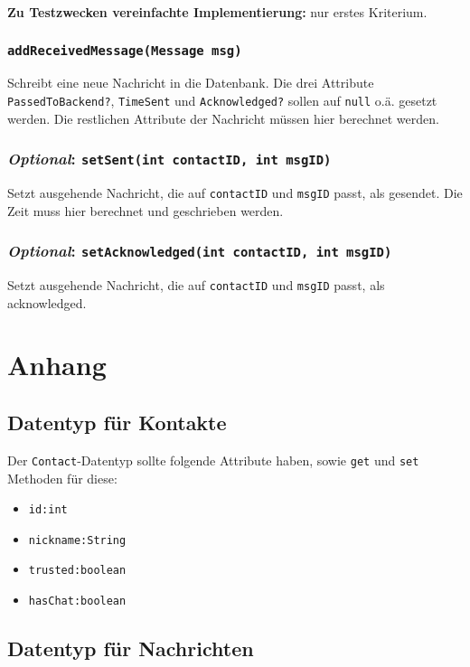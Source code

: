 \documentclass[a4paper]{article}
\begin{document}
    \textbf{Zu Testzwecken vereinfachte Implementierung:}
    nur erstes Kriterium.

    \subsubsection{\texttt{addReceivedMessage(Message msg)}}
    Schreibt eine neue Nachricht in die Datenbank.
    Die drei Attribute \texttt{PassedToBackend?}, \texttt{TimeSent} und \texttt{Acknowledged?} sollen auf \texttt{null} o.ä. gesetzt werden.
    Die restlichen Attribute der Nachricht müssen hier berechnet werden.

    \subsubsection{\textit{Optional}: \texttt{setSent(int contactID, int msgID)}}
    Setzt ausgehende Nachricht, die auf \texttt{contactID} und \texttt{msgID} passt, als gesendet.
    Die Zeit muss hier berechnet und geschrieben werden.

    \subsubsection{\textit{Optional}: \texttt{setAcknowledged(int contactID, int msgID)}}
    Setzt ausgehende Nachricht, die auf \texttt{contactID} und \texttt{msgID} passt, als acknowledged.

    \section{Anhang}

    \subsection{Datentyp für Kontakte}

    Der \texttt{Contact}-Datentyp sollte folgende Attribute haben, sowie \texttt{get} und \texttt{set} Methoden für diese:
    \begin{itemize}
        \item
            \texttt{id:int}
        \item
            \texttt{nickname:String}
        \item
            \texttt{trusted:boolean}
        \item
            \texttt{hasChat:boolean}
    \end{itemize}

    \subsection{Datentyp für Nachrichten}
\end{document}
